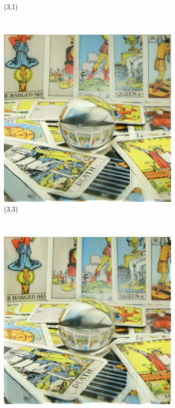 \documentclass[11pt,a4paper,titlepage]{article}
\begin{document}
\begin{figure}
\begin{subfigure}[t]{0.3\textwidth}
		\caption{(3,1)}
	\end{subfigure}%
	~
	\begin{subfigure}[t]{0.3\textwidth}
		\includegraphics[width=\textwidth]{results/tile_blending/tarot6x6x512x512-512x512x5-sampling=2x_tileRes=200x200_overlap=0.5/Reconstruction_of_view_(3,3).png}
		\caption{(3,3)}
	\end{subfigure}%
	~
	\begin{subfigure}[t]{0.3\textwidth}
		\includegraphics[width=\textwidth]{results/tile_blending/tarot6x6x512x512-512x512x5-sampling=2x_tileRes=200x200_overlap=0.5/Reconstruction_of_view_(3,6).png} 

\end{subfigure}
\end{figure}
\end{document}
